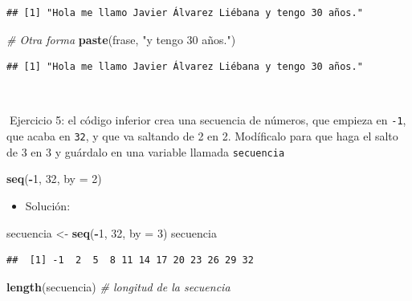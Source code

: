 \documentclass[11pt,]{book}
\newenvironment{Shaded}{\begin{snugshade}}{\end{snugshade}}
\newcommand{\CommentTok}[1]{\textcolor[rgb]{0.37,0.37,0.37}{\textit{#1}}}
\newcommand{\DataTypeTok}[1]{\textcolor[rgb]{0.27,0.27,0.27}{#1}}
\newcommand{\DecValTok}[1]{\textcolor[rgb]{0.06,0.06,0.06}{#1}}
\newcommand{\KeywordTok}[1]{\textcolor[rgb]{0.27,0.27,0.27}{\textbf{#1}}}
\newcommand{\NormalTok}[1]{#1}
\newcommand{\OperatorTok}[1]{\textcolor[rgb]{0.43,0.43,0.43}{\textbf{#1}}}
\newcommand{\StringTok}[1]{\textcolor[rgb]{0.5,0.5,0.5}{#1}}
\providecommand{\tightlist}{%
  \setlength{\itemsep}{0pt}\setlength{\parskip}{0pt}}
\begin{document}
\begin{verbatim}
## [1] "Hola me llamo Javier Álvarez Liébana y tengo 30 años."
\end{verbatim}

\begin{Shaded}
\begin{Highlighting}[]
\CommentTok{# Otra forma}
\KeywordTok{paste}\NormalTok{(frase, }\StringTok{"y tengo 30 años."}\NormalTok{)}
\end{Highlighting}
\end{Shaded}

\begin{verbatim}
## [1] "Hola me llamo Javier Álvarez Liébana y tengo 30 años."
\end{verbatim}

~

📝Ejercicio 5: el código inferior crea una secuencia de números, que empieza en \texttt{-1}, que acaba en \texttt{32}, y que va saltando de 2 en 2. Modíficalo para que haga el salto de 3 en 3 y guárdalo en una variable llamada \texttt{secuencia}

\begin{Shaded}
\begin{Highlighting}[]
\KeywordTok{seq}\NormalTok{(}\OperatorTok{-}\DecValTok{1}\NormalTok{, }\DecValTok{32}\NormalTok{, }\DataTypeTok{by =} \DecValTok{2}\NormalTok{)}
\end{Highlighting}
\end{Shaded}

\begin{itemize}
\tightlist
\item
  Solución:
\end{itemize}

\begin{Shaded}
\begin{Highlighting}[]
\NormalTok{secuencia <-}\StringTok{ }\KeywordTok{seq}\NormalTok{(}\OperatorTok{-}\DecValTok{1}\NormalTok{, }\DecValTok{32}\NormalTok{, }\DataTypeTok{by =} \DecValTok{3}\NormalTok{)}
\NormalTok{secuencia}
\end{Highlighting}
\end{Shaded}

\begin{verbatim}
##  [1] -1  2  5  8 11 14 17 20 23 26 29 32
\end{verbatim}

\begin{Shaded}
\begin{Highlighting}[]
\KeywordTok{length}\NormalTok{(secuencia) }\CommentTok{# longitud de la secuencia}
\end{Highlighting}
\end{Shaded}
\end{document}
